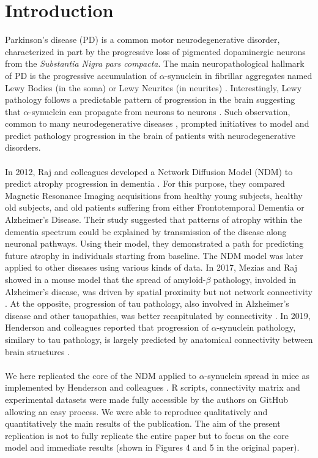 \section{Introduction}

Parkinson's disease (PD) is a common motor neurodegenerative disorder, characterized in part by the progressive loss of pigmented dopaminergic neurons from the \textit{Substantia Nigra pars compacta}. The main neuropathological hallmark of PD is the progressive accumulation of $\alpha$-synuclein in fibrillar aggregates named Lewy Bodies (in the soma) or Lewy Neurites (in neurites) \cite{Dehay_2015}. Interestingly, Lewy pathology follows a predictable pattern of progression in the brain suggesting that $\alpha$-synuclein can propagate from neurons to neurons \cite{Braak_2003}. Such observation, common to many neurodegenerative diseases \cite{Jucker_2018}, prompted initiatives to model and predict pathology progression in the brain of patients with neurodegenerative disorders.\\
\\
In 2012, Raj and colleagues developed a Network Diffusion Model (NDM) to predict atrophy progression in dementia \cite{Raj_2012}. For this purpose, they compared Magnetic Resonance Imaging acquisitions from healthy young subjects, healthy old subjects, and old patients suffering from either Frontotemporal Dementia or Alzheimer's Disease. Their study suggested that patterns of atrophy within the dementia spectrum could be explained by transmission of the disease along neuronal pathways. Using their model, they demonstrated a path for predicting future atrophy in individuals starting from baseline. The NDM model was later applied to other diseases using various kinds of data. In 2017, Mezias and Raj showed in a mouse model that the spread of amyloid-$\beta$ pathology, involded in Alzheimer's disease, was driven by spatial proximity but not network connectivity \cite{Mezias_2017_abeta}. At the opposite, progression of tau pathology, also involved in Alzheimer's disease and other tauopathies, was better recapitulated by connectivity \cite{Mezias_2017_tau}. In 2019, Henderson and colleagues reported that progression of $\alpha$-synuclein pathology, similary to tau pathology, is largely predicted by anatomical connectivity between brain structures \cite{Henderson_2019}.\\
\\
We here replicated the  core of the NDM applied to $\alpha$-synuclein spread in mice as implemented by Henderson and colleagues \cite{Henderson_2019}. R scripts, connectivity matrix and experimental datasets were made fully accessible by the authors on GitHub allowing an easy process. We were able to reproduce qualitatively and quantitatively the main results of the publication. The aim of the present replication is not to fully replicate the entire paper but to focus on the core model and immediate results (shown in Figures 4 and 5 in the original paper).\\
\\


